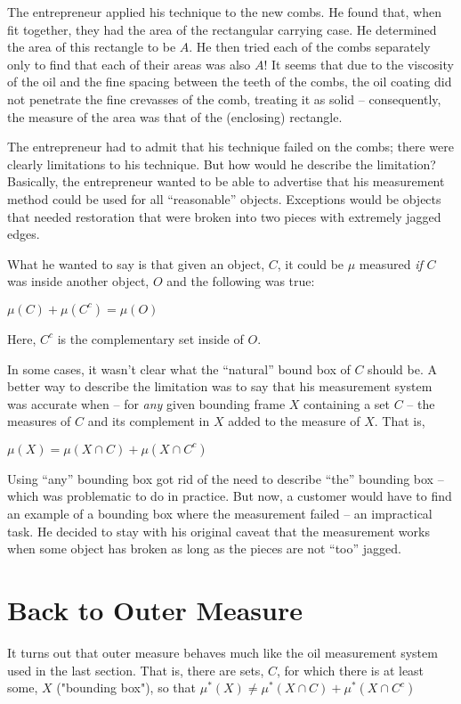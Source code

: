\documentclass{article}
\begin{document}
The entrepreneur applied his technique to the new combs. 
He found that, when fit together, they had the area of the rectangular carrying case.
He determined the area of this rectangle to be $A$. He then tried each of the 
combs separately only to find that each of their areas was also $A$!
It seems that due to the viscosity of the oil and the fine spacing between the 
teeth of the combs, the oil coating did not penetrate the fine crevasses of the 
comb, treating it as solid -- consequently, the measure of the area was 
that of the (enclosing) rectangle.

The entrepreneur had to admit that his technique failed on the combs; 
there were clearly limitations to his technique. 
But how would he describe the limitation? Basically, the entrepreneur wanted to 
be able to advertise that his measurement method could be used for all 
``reasonable'' objects. Exceptions would be objects that needed restoration 
that were broken into two pieces with extremely jagged edges.

What he wanted to say is that given an object, $C$, it could be $\mu$ measured 
{\em if\/} $C$ was inside another object, $O$ and the following was true:

$\mu(C) + \mu(C^c) = \mu(O)$

Here, $C^c$ is the complementary set inside of $O$.

In some cases, it wasn't clear what the ``natural'' bound box of $C$ should be. A better way 
to describe the limitation was to say that his measurement system was accurate 
when -- for {\em any\/} given bounding frame $X$ containing a set $C$ -- 
the measures of $C$ and 
its complement in $X$ added to the measure of $X$. That is,

$\mu(X) = \mu(X \cap C) + \mu(X \cap C^c)$

Using ``any'' bounding box got rid of the need to describe ``the'' bounding box -- which
was problematic to do in practice.
But now, a customer would have to find an example of a bounding box where the 
measurement failed -- an impractical task.
He decided to stay with his original caveat that the measurement works when some object has 
broken as long as the pieces are not ``too'' jagged.


\section{Back to Outer Measure}
It turns out that outer measure behaves much like the oil measurement system 
used in the last section. That is, there are sets, $C$, for which there is at 
least some, $X$ ("bounding box"), so that
$\mu^*(X) \neq \mu^*(X \cap C) + \mu^*(X \cap C^c)$
\end{document}
